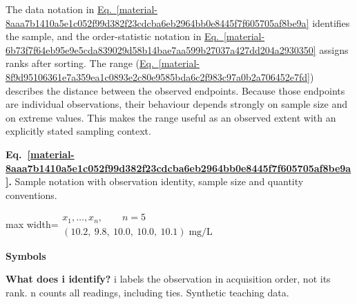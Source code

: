 \documentclass[11pt,a4paper]{article}
\begin{document}
\medskip

The data notation in \hyperref[material-8aaa7b1410a5e1c052f99d382f23cdcba6eb2964bb0e8445f7f605705af8be9a]{Eq.~\ref*{material-8aaa7b1410a5e1c052f99d382f23cdcba6eb2964bb0e8445f7f605705af8be9a}} identifies the sample, and the order-statistic notation in \hyperref[material-6b73f7f64eb95e9e5cda839029d58b14bae7aa599b27037a427dd204a2930350]{Eq.~\ref*{material-6b73f7f64eb95e9e5cda839029d58b14bae7aa599b27037a427dd204a2930350}} assigns ranks after sorting. The range (\hyperref[material-8f9d95106361e7a359ea1c0893e2c80e9585bda6c2f983c97a0b2a706452e7fd]{Eq.~\ref*{material-8f9d95106361e7a359ea1c0893e2c80e9585bda6c2f983c97a0b2a706452e7fd}}) describes the distance between the observed endpoints. Because those endpoints are individual observations, their behaviour depends strongly on sample size and on extreme values. This makes the range useful as an observed extent with an explicitly stated sampling context.


\par\medskip
\noindent\begin{minipage}{\linewidth}
\label{material-8aaa7b1410a5e1c052f99d382f23cdcba6eb2964bb0e8445f7f605705af8be9a}
\noindent\textbf{Eq.~\ref*{material-8aaa7b1410a5e1c052f99d382f23cdcba6eb2964bb0e8445f7f605705af8be9a}.} Sample notation with observation identity, sample size and quantity conventions.\par\nopagebreak
\begin{center}\begin{adjustbox}{max width=\linewidth}$\displaystyle \begin{gathered}x_1,\ldots,x_n,\qquad n=5\\(10.2,\ 9.8,\ 10.0,\ 10.0,\ 10.1)\;\mathrm{mg/L}\end{gathered}$\end{adjustbox}\end{center}

\par\noindent\textbf{Symbols}

\par\noindent\textbf{What does i identify?} i labels the observation in acquisition order, not its rank. n counts all readings, including ties. Synthetic teaching data.

\end{minipage}\par
\medskip
\end{document}

